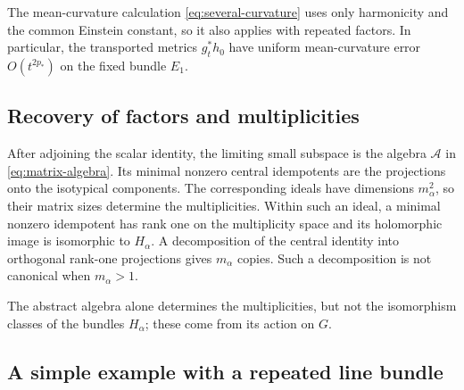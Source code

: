 The mean-curvature calculation \eqref{eq:several-curvature} uses
only harmonicity and the common Einstein constant, so it also applies
with repeated factors. In particular, the transported metrics
$g_t^*h_0$ have uniform mean-curvature error $O(t^{2p_*})$ on the
fixed bundle $E_1$.

\subsection{Recovery of factors and multiplicities}

After adjoining the scalar identity, the limiting small subspace is
the algebra $\mathcal A$ in \eqref{eq:matrix-algebra}. Its minimal
nonzero central idempotents are the projections onto the isotypical
components. The corresponding ideals have dimensions $m_\alpha^2$,
so their matrix sizes determine the multiplicities. Within such an
ideal, a minimal nonzero idempotent has rank one on the multiplicity
space and its holomorphic image is isomorphic to $H_\alpha$.
A decomposition of the central identity into orthogonal rank-one
projections gives $m_\alpha$ copies. Such a decomposition is not
canonical when $m_\alpha>1$.

The abstract algebra alone determines the multiplicities, but not the
isomorphism classes of the bundles $H_\alpha$; these come from its action
on $G$.

\subsection{A simple example with a repeated line bundle}\label{sec:repeated-example}

